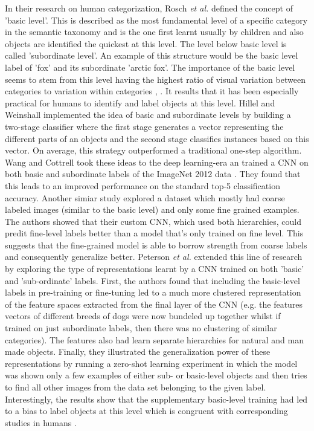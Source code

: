 \documentclass[12pt]{report}
\begin{document}
In their research on human categorization, Rosch \textit{et al.} \cite{Rosch1976} defined the concept of 'basic level'. This is described as the most fundamental level of a specific category in the semantic taxonomy and is the one first learnt usually by children and also objects are identified the quickest at this level. The level below basic level is called 'subordinate level'. An example of this structure would be the basic level label of 'fox' and its subordinate 'arctic fox'. The importance of the basic level seems to stem from this level having the highest ratio of visual variation between categories to variation within categories \cite{Rosch1976}, \cite{Joliceur1984}. It results that it has been especially practical for humans to identify and label objects at this level. Hillel and Weinshall \cite{Hillel2007} implemented the idea of basic and subordinate levels by building a two-stage classifier where the first stage generates a vector representing the different parts of an objects and the second stage classifies instances based on this vector. On average, this strategy outperformed a traditional one-step algorithm. Wang and Cottrell \cite{Wang2015} took these ideas to the deep learning-era an trained a CNN on both basic and subordinate labels of the ImageNet 2012 data \cite{Russakovsky2015}. They found that this leads to an improved performance on the standard top-5 classification accuracy. Another simiar study \cite{Lei2018} explored a dataset which mostly had coarse labeled images (similar to the basic level) and only some fine grained examples. The authors showed that their custom CNN, which used both hierarchies, could predit fine-level labels better than a model that's only trained on fine level. This suggests that the fine-grained model is able to borrow strength from coarse labels and consequently generalize better. Peterson \textit{et al.} extended this line of research by exploring the type of representations learnt by a CNN trained on both 'basic' and 'sub-ordinate' labels. First, the authors found that including the basic-level labels in pre-training or fine-tuning led to a much more clustered representation of the feature spaces extracted from the final layer of the CNN (e.g. the features vectors of different breeds of dogs were now bundeled up together whilst if trained on just subordinate labels, then there was no clustering of similar categories). The features also had learn separate hierarchies for natural and man made objects. Finally, they illustrated the generalization power of these representations by running a zero-shot learning experiment in which the model was shown only a few examples of either sub- or basic-level objects and then tries to find all other images from the data set belonging to the given label. Interestingly, the results show that the supplementary basic-level training had led to a bias to label objects at this level which is congruent with corresponding studies in humans \cite{Xu2000}.
\end{document}
